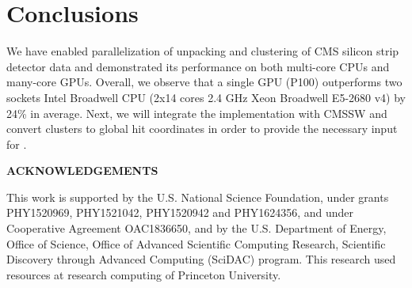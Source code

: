 \documentclass[10pt, paper=a4, UKenglish]{article}
\def\Acknowledgements{\bigskip  \bigskip \begin{center} \begin{large}
      \bf ACKNOWLEDGEMENTS \end{large}\end{center}}
\begin{document}
\section{Conclusions}
We have enabled parallelization of unpacking and clustering of CMS silicon strip detector data and demonstrated its performance on both multi-core CPUs and many-core GPUs. Overall, we observe that a single GPU (P100) outperforms two sockets Intel Broadwell CPU (2x14 cores 2.4 GHz Xeon Broadwell E5-2680 v4) by 24\% in average. Next, we will integrate the implementation with CMSSW and convert clusters to global hit coordinates in order to provide the necessary input for \mkFit. 


\Acknowledgements
This work is supported by the U.S. National Science Foundation, under grants PHY1520969, PHY1521042, PHY1520942 and PHY1624356, and under Cooperative Agreement OAC1836650, and by the U.S. Department
of Energy, Office of Science, Office of Advanced Scientific Computing Research, Scientific Discovery through Advanced Computing (SciDAC) program. This research used resources at research computing of Princeton University.







\end{document}
